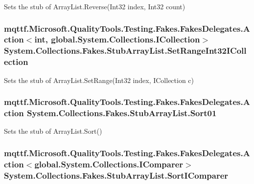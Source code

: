 Sets the stub of Array\-List.\-Reverse(\-Int32 index, Int32 count)

\hypertarget{class_system_1_1_collections_1_1_fakes_1_1_stub_array_list_a69e054ef0e91407c9eff367394f1d0b8}{
\subsubsection[{Set\-Range\-Int32\-I\-Collection}]{\setlength{\rightskip}{0pt plus 5cm}mqttf.\-Microsoft.\-Quality\-Tools.\-Testing.\-Fakes.\-Fakes\-Delegates.\-Action$<$int, global.\-System.\-Collections.\-I\-Collection$>$ System.\-Collections.\-Fakes.\-Stub\-Array\-List.\-Set\-Range\-Int32\-I\-Collection}}\label{class_system_1_1_collections_1_1_fakes_1_1_stub_array_list_a69e054ef0e91407c9eff367394f1d0b8}


Sets the stub of Array\-List.\-Set\-Range(\-Int32 index, I\-Collection c)

\hypertarget{class_system_1_1_collections_1_1_fakes_1_1_stub_array_list_a0b5e9bba4b49d8bd4e1711e6ba5d9ecb}{
\subsubsection[{Sort01}]{\setlength{\rightskip}{0pt plus 5cm}mqttf.\-Microsoft.\-Quality\-Tools.\-Testing.\-Fakes.\-Fakes\-Delegates.\-Action System.\-Collections.\-Fakes.\-Stub\-Array\-List.\-Sort01}}\label{class_system_1_1_collections_1_1_fakes_1_1_stub_array_list_a0b5e9bba4b49d8bd4e1711e6ba5d9ecb}


Sets the stub of Array\-List.\-Sort()

\hypertarget{class_system_1_1_collections_1_1_fakes_1_1_stub_array_list_a8a7855319b37c9131d03d34dbbc74020}{
\subsubsection[{Sort\-I\-Comparer}]{\setlength{\rightskip}{0pt plus 5cm}mqttf.\-Microsoft.\-Quality\-Tools.\-Testing.\-Fakes.\-Fakes\-Delegates.\-Action$<$global.\-System.\-Collections.\-I\-Comparer$>$ System.\-Collections.\-Fakes.\-Stub\-Array\-List.\-Sort\-I\-Comparer}}\label{class_system_1_1_collections_1_1_fakes_1_1_stub_array_list_a8a7855319b37c9131d03d34dbbc74020}


